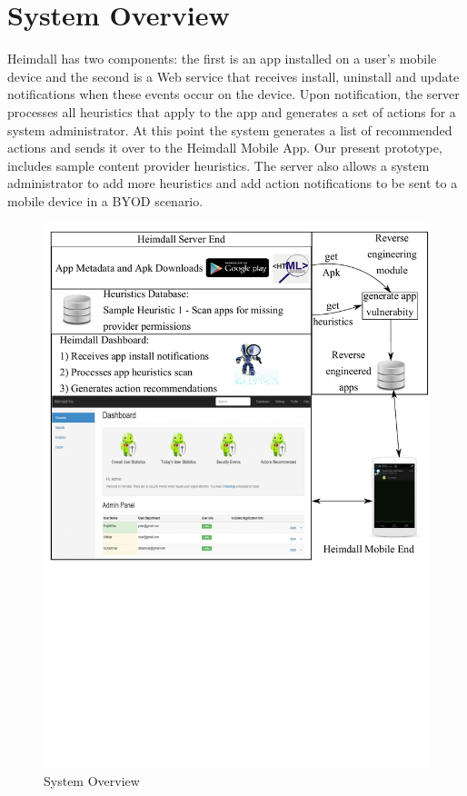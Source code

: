 \section{System Overview}
\label{overview}
\noindent
Heimdall has two components: the first is an app installed on a user's mobile device and the second is a Web service that receives install, uninstall and update notifications when these events occur on the device. Upon notification, the server processes all heuristics that apply to the app and generates a set of actions for a system administrator. At this point the system generates a list of recommended actions and sends it over to the Heimdall Mobile App. Our present prototype, includes sample content provider heuristics. The server also allows a system administrator to add more heuristics and add action notifications to be sent to a mobile device in a BYOD scenario.

\begin{figure}[tb]
	\centering
	\includegraphics[width=\columnwidth]{images/architecture}
	\caption{System Overview}
	\label{fig:arch}
\end{figure}

